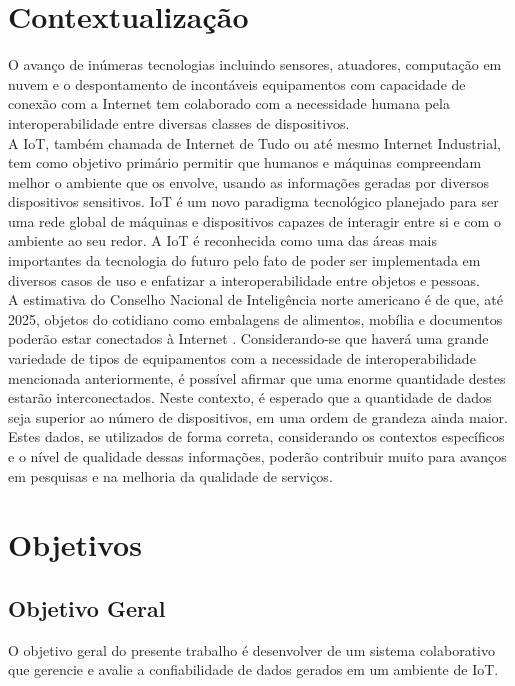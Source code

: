 \section{Contextualização}
\qquad
O avanço de inúmeras tecnologias incluindo sensores, atuadores, computação em nuvem e o despontamento de
incontáveis equipamentos com capacidade de conexão com a Internet tem colaborado com a necessidade humana pela interoperabilidade entre diversas classes de dispositivos.
\\ \null
\qquad
A \acrfull{IoT}, também chamada de Internet de Tudo ou até mesmo Internet Industrial, tem como objetivo primário %
permitir que humanos e máquinas compreendam melhor o ambiente que os envolve, usando as informações geradas por
diversos dispositivos sensitivos. \acrshort{IoT} é um novo paradigma tecnológico planejado para ser uma rede %
global de máquinas e dispositivos capazes de interagir entre si e com o ambiente ao seu redor.
A \acrshort{IoT} é reconhecida como uma das áreas mais importantes da tecnologia do futuro pelo fato de %
poder ser implementada em diversos casos de uso e enfatizar a interoperabilidade entre objetos e pessoas.
\\ \null
\qquad A estimativa do Conselho Nacional de Inteligência norte americano é de que, até 2025, objetos do cotidiano como embalagens de alimentos, mobília e documentos
poderão estar conectados à Internet \cite{intelsix}. Considerando-se que haverá uma grande variedade de tipos de equipamentos com a necessidade de interoperabilidade mencionada anteriormente, %
é possível afirmar que uma enorme quantidade destes estarão interconectados. Neste contexto, %
é esperado que a quantidade de dados seja superior ao número de dispositivos, em uma ordem de grandeza ainda maior.
Estes dados, se utilizados de forma correta, considerando os contextos específicos e o nível de qualidade dessas informações, poderão
contribuir muito para avanços em pesquisas e na melhoria da qualidade de serviços.
\section{Objetivos}
\subsection{Objetivo Geral}
\qquad O objetivo geral do presente trabalho é desenvolver de um sistema colaborativo que gerencie e avalie a confiabilidade de dados
gerados em um ambiente de \acrlong{IoT}.
